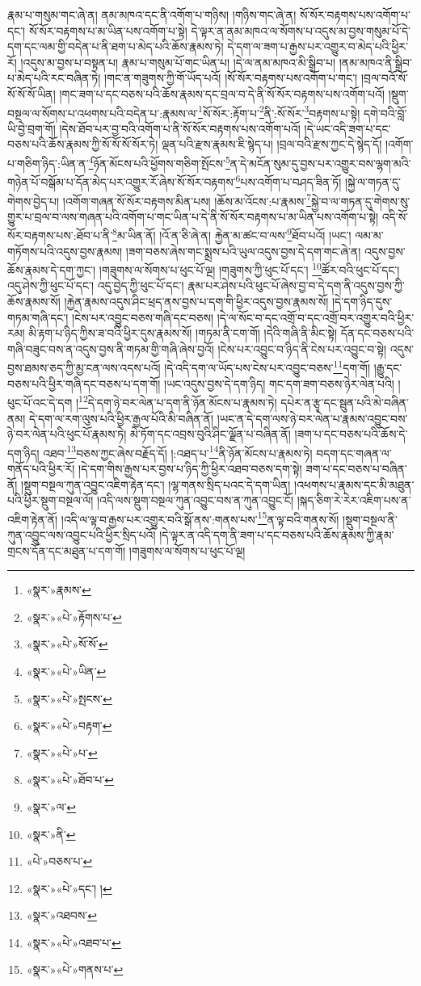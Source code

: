 རྣམ་པ་གསུམ་གང་ཞེ་ན། ནམ་མཁའ་དང་ནི་འགོག་པ་གཉིས། །གཉིས་གང་ཞེ་ན། སོ་སོར་བརྟགས་པས་འགོག་པ་དང་། སོ་སོར་བརྟགས་པ་མ་ཡིན་པས་འགོག་པ་སྟེ། དེ་ལྟར་ན་ནམ་མཁའ་ལ་སོགས་པ་འདུས་མ་བྱས་གསུམ་པོ་དེ་དག་དང་ལམ་གྱི་བདེན་པ་ནི་ཐག་པ་མེད་པའི་ཆོས་རྣམས་ཏེ། དེ་དག་ལ་ཟག་པ་རྒྱས་པར་འགྱུར་བ་མེད་པའི་ཕྱིར་རོ། །འདུས་མ་བྱས་པ་བསྟན་པ། རྣམ་པ་གསུམ་པོ་གང་ཡིན་པ། །དེ་ལ་ནམ་མཁའ་མི་སྒྲིབ་པ། །ནམ་མཁའ་ནི་སྒྲིབ་པ་མེད་པའི་རང་བཞིན་ཏེ། །གང་ན་གཟུགས་ཀྱི་གོ་ཡོད་པའོ། །སོ་སོར་བརྟགས་པས་འགོག་པ་གང་། །བྲལ་བའོ་སོ་སོ་སོ་སོ་ཡིན། །གང་ཟག་པ་དང་བཅས་པའི་ཆོས་རྣམས་དང་བྲལ་བ་དེ་ནི་སོ་སོར་བརྟགས་པས་འགོག་པའོ། །སྡུག་བསྔལ་ལ་སོགས་པ་འཕགས་པའི་བདེན་པ་:རྣམས་ལ་\footnote{«སྣར་»རྣམས་}སོ་སོར་:རྟོག་པ་\footnote{«སྣར་»«པེ་»རྟོགས་པ་}ནི་:སོ་སོར་\footnote{«སྣར་»«པེ་»སོ་སོ་}བརྟགས་པ་སྟེ། དགེ་བའི་བློ་ཡི་བྱེ་བྲག་གོ། །དེས་ཐོབ་པར་བྱ་བའི་འགོག་པ་ནི་སོ་སོར་བརྟགས་པས་འགོག་པའོ། །དེ་ཡང་འདི་ཟག་པ་དང་བཅས་པའི་ཆོས་རྣམས་ཀྱི་སོ་སོ་སོ་སོར་ཏེ། ལྡན་པའི་རྫས་རྣམས་ཇི་སྙེད་པ། །བྲལ་བའི་རྫས་ཀྱང་དེ་སྙེད་དོ། །འགོག་པ་གཅིག་ཉིད་:ཡིན་ན་\footnote{«སྣར་»«པེ་»ཡིན་}ཉོན་མོངས་པའི་ཕྱོགས་གཅིག་སྤོངས་\footnote{«སྣར་»«པེ་»སྤངས་}ན་དེ་མངོན་སུམ་དུ་བྱས་པར་འགྱུར་བས་ལྷག་མའི་གཉེན་པོ་བསྒོམ་པ་དོན་མེད་པར་འགྱུར་རོ་ཞེས་སོ་སོར་བརྟགས་\footnote{«སྣར་»«པེ་»བརྟག་}པས་འགོག་པ་བཤད་ཟིན་ཏོ། །སྐྱེ་ལ་གཏན་དུ་གེགས་བྱེད་པ། །འགོག་གཞན་སོ་སོར་བརྟགས་མིན་པས། །ཆོས་མ་འོངས་:པ་རྣམས་\footnote{«སྣར་»«པེ་»པ་}སྐྱེ་བ་ལ་གཏན་དུ་གེགས་སུ་གྱུར་པ་བྲལ་བ་ལས་གཞན་པའི་འགོག་པ་གང་ཡིན་པ་དེ་ནི་སོ་སོར་བརྟགས་པ་མ་ཡིན་པས་འགོག་པ་སྟེ། འདི་སོ་སོར་བརྟགས་པས་:ཐོབ་པ་ནི་\footnote{«སྣར་»«པེ་»ཐོབ་པ་}མ་ཡིན་ནོ། །འོ་ན་ཅི་ཞེ་ན། རྐྱེན་མ་ཚང་བ་ལས་\footnote{«སྣར་»ལ་}ཐོབ་པའོ། །ཡང་། ལམ་མ་གཏོགས་པའི་འདུས་བྱས་རྣམས། །ཟག་བཅས་ཞེས་གང་སྨྲས་པའི་ཡུལ་འདུས་བྱས་དེ་དག་གང་ཞེ་ན། འདུས་བྱས་ཆོས་རྣམས་དེ་དག་ཀྱང་། །གཟུགས་ལ་སོགས་པ་ཕུང་པོ་ལྔ། །གཟུགས་ཀྱི་ཕུང་པོ་དང་། \footnote{«སྣར་»ནི་}ཚོར་བའི་ཕུང་པོ་དང་། འདུ་ཤེས་ཀྱི་ཕུང་པོ་དང་། འདུ་བྱེད་ཀྱི་ཕུང་པོ་དང་། རྣམ་པར་ཤེས་པའི་ཕུང་པོ་ཞེས་བྱ་བ་དེ་དག་ནི་འདུས་བྱས་ཀྱི་ཆོས་རྣམས་སོ། །རྐྱེན་རྣམས་འདུས་ཤིང་ཕྲད་ནས་བྱས་པ་དག་གི་ཕྱིར་འདུས་བྱས་རྣམས་སོ། །དེ་དག་ཉིད་དུས་གཏམ་གཞི་དང་། །ངེས་པར་འབྱུང་བཅས་གཞི་དང་བཅས། །དེ་ལ་སོང་བ་དང་འགྲོ་བ་དང་འགྲོ་བར་འགྱུར་བའི་ཕྱིར་རམ། མི་རྟག་པ་ཉིད་ཀྱིས་ཟ་བའི་ཕྱིར་དུས་རྣམས་སོ། །གཏམ་ནི་ངག་གོ། །དེའི་གཞི་ནི་མིང་སྟེ། དོན་དང་བཅས་པའི་གཞི་བཟུང་བས་ན་འདུས་བྱས་ནི་གཏམ་གྱི་གཞི་ཞེས་བྱའོ། །ངེས་པར་འབྱུང་བ་ཉིད་ནི་ངེས་པར་འབྱུང་བ་སྟེ། འདུས་བྱས་ཐམས་ཅད་ཀྱི་མྱ་ངན་ལས་འདས་པའོ། །དེ་འདི་དག་ལ་ཡོད་པས་ངེས་པར་འབྱུང་བཅས་\footnote{«པེ་»བཅས་པ་}དག་གོ། །རྒྱུ་དང་བཅས་པའི་ཕྱིར་གཞི་དང་བཅས་པ་དག་གོ། །ཡང་འདུས་བྱས་དེ་དག་ཉིད། གང་དག་ཟག་བཅས་ཉེར་ལེན་པའི། །ཕུང་པོ་འང་དེ་དག །\footnote{«སྣར་»«པེ་»དང་། །}དེ་དག་ཉེ་བར་ལེན་པ་དག་ནི་ཉོན་མོངས་པ་རྣམས་ཏེ། དཔེར་ན་རྩྭ་དང་སྦུན་པའི་མེ་བཞིན་ནམ། དེ་དག་ལ་རག་ལུས་པའི་ཕྱིར་རྒྱལ་པོའི་མི་བཞིན་ནོ། །ཡང་ན་དེ་དག་ལས་ཉེ་བར་ལེན་པ་རྣམས་འབྱུང་བས་ཉེ་བར་ལེན་པའི་ཕུང་པོ་རྣམས་ཏེ། མེ་ཏོག་དང་འབྲས་བུའི་ཤིང་ལྗོན་པ་བཞིན་ནོ། །ཟག་པ་དང་བཅས་པའི་ཆོས་དེ་དག་ཉིད། འཐབ་\footnote{«སྣར་»འཐབས་}བཅས་ཀྱང་ཞེས་བརྗོད་དོ། །:འཐད་པ་\footnote{«སྣར་»«པེ་»འཐབ་པ་}ནི་ཉོན་མོངས་པ་རྣམས་ཏེ། བདག་དང་གཞན་ལ་གནོད་པའི་ཕྱིར་རོ། །དེ་དག་གིས་རྒྱས་པར་བྱས་པ་ཉིད་ཀྱི་ཕྱིར་འཐབ་བཅས་དག་སྟེ། ཟག་པ་དང་བཅས་པ་བཞིན་ནོ། །སྡུག་བསྔལ་ཀུན་འབྱུང་འཇིག་རྟེན་དང་། །ལྷ་གནས་སྲིད་པའང་དེ་དག་ཡིན། །འཕགས་པ་རྣམས་དང་མི་མཐུན་པའི་ཕྱིར་སྡུག་བསྔལ་ལོ། །འདི་ལས་སྡུག་བསྔལ་ཀུན་འབྱུང་བས་ན་ཀུན་འབྱུང་ངོ། །སྐད་ཅིག་རེ་རེར་འཇིག་པས་ན་འཇིག་རྟེན་ནོ། །འདི་ལ་ལྟ་བ་རྒྱས་པར་འགྱུར་བའི་སྒོ་ནས་:གནས་པས་\footnote{«སྣར་»«པེ་»གནས་པ་}ན་ལྟ་བའི་གནས་སོ། །སྡུག་བསྔལ་ནི་ཀུན་འབྱུང་ལས་འབྱུང་པའི་ཕྱིར་སྲིད་པའོ། །དེ་ལྟར་ན་འདི་དག་ནི་ཟག་པ་དང་བཅས་པའི་ཆོས་རྣམས་ཀྱི་རྣམ་གྲངས་དོན་དང་མཐུན་པ་དག་གོ། །གཟུགས་ལ་སོགས་པ་ཕུང་པོ་ལྔ། 